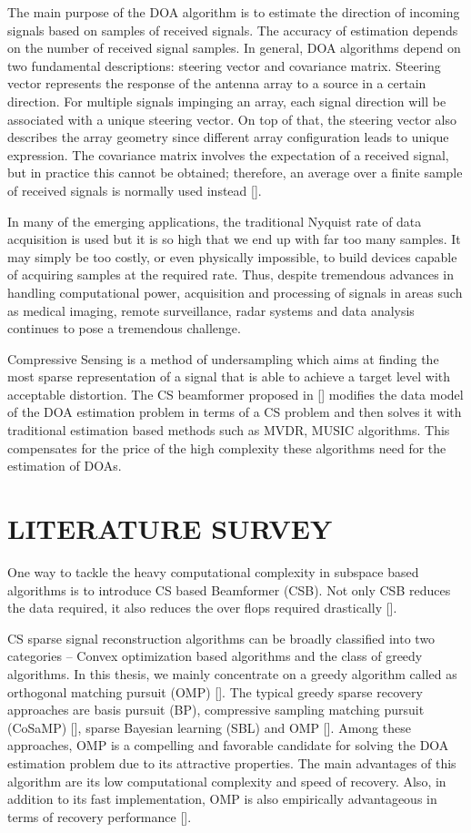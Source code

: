 \documentclass[12pt,a4paper]{article}
\theoremstyle{plain}
\theoremstyle{definition}
\begin{document}
The main purpose of the DOA algorithm is to estimate the direction of incoming signals based on samples of received signals. The accuracy of estimation depends on the number of received signal samples. In general, DOA algorithms depend on two fundamental descriptions: steering vector and covariance matrix. Steering vector represents the response of the antenna array to a source in a certain direction. For multiple signals impinging an array, each signal direction will be associated with a unique steering vector. On top of that, the steering vector also describes the array geometry since different array configuration leads to unique expression. The covariance matrix involves the expectation of a received signal, but in practice this cannot be obtained; therefore, an average over a finite sample of received signals is normally used instead [\citet{R13}].

In many of the emerging applications, the traditional Nyquist rate of data acquisition is used but it is so high that we end up with far too many samples. It may simply be too costly, or even physically impossible, to build devices capable of acquiring samples at the required rate. Thus, despite tremendous advances in handling computational power, acquisition and processing of signals in areas such as medical imaging, remote surveillance, radar systems and data analysis continues to pose a tremendous challenge.

Compressive Sensing is a method of undersampling which aims at finding the most sparse representation of a signal that is able to achieve a target level with acceptable distortion. The CS beamformer proposed in [\citet{R14}] modifies the data model of the DOA estimation problem in terms of a CS problem and then solves it with traditional estimation based methods such as MVDR, MUSIC algorithms. This compensates for the price of the high complexity these algorithms need for the estimation of DOAs.

\section{LITERATURE SURVEY}
One way to tackle the heavy computational complexity in subspace based algorithms is to introduce CS based Beamformer (CSB). Not only CSB reduces the data required, it also reduces the over flops required drastically [\citet{R14}]. 

CS sparse signal reconstruction algorithms can be broadly classified into two categories – Convex optimization based algorithms and the class of greedy algorithms. In this thesis, we mainly concentrate on a greedy algorithm called as orthogonal matching pursuit (OMP) [\citet{R15}]. The typical greedy sparse recovery approaches are basis pursuit (BP), compressive sampling matching pursuit (CoSaMP) [\citet{R16}], sparse Bayesian learning (SBL) and OMP [\citet{R17}]. Among these approaches, OMP is a compelling and favorable candidate for solving the DOA estimation problem due to its attractive properties. The main advantages of this algorithm are its low computational complexity and speed of recovery. Also, in addition to its fast implementation, OMP is also empirically advantageous in terms of recovery performance [\citet{R18}].
\end{document}
